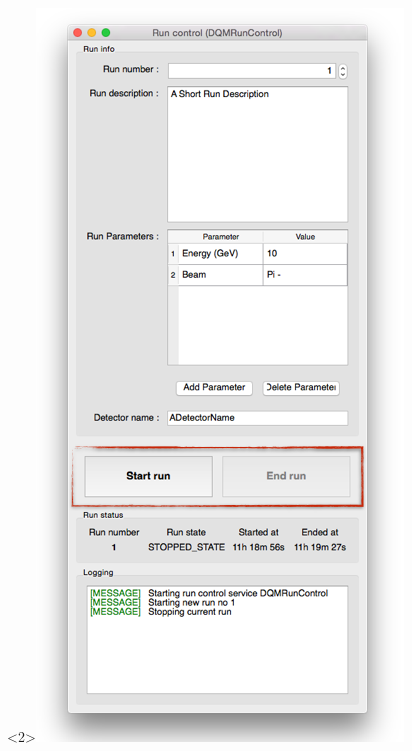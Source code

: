 \documentclass[8pt]{beamer}
\begin{document}
\begin{frame}
\begin{center}
\begin{overlayarea}{\textwidth}{\textheight}
\begin{columns}
\begin{center}
            \begin{onlyenv}<2>\includegraphics[width=\textwidth]{figs/RunControl/RunControl_SOR.png}\end{onlyenv}

\end{center}
\end{columns}
\end{overlayarea}
\end{center}
\end{frame}
\end{document}
